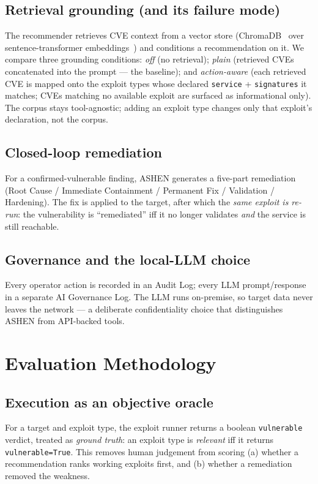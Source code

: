 \documentclass[conference]{IEEEtran}
\newcommand{\code}[1]{\texttt{#1}}
\begin{document}
\subsection{Retrieval grounding (and its failure mode)}
The recommender retrieves CVE context from a vector store (ChromaDB~\cite{chroma}
over sentence-transformer embeddings~\cite{sbert}) and conditions a recommendation
on it. We
compare three grounding conditions: \emph{off} (no retrieval); \emph{plain}
(retrieved CVEs concatenated into the prompt --- the baseline); and
\emph{action-aware} (each retrieved CVE is mapped onto the exploit types whose
declared \code{service} + \code{signatures} it matches; CVEs matching no available
exploit are surfaced as informational only). The corpus stays tool-agnostic;
adding an exploit type changes only that exploit's declaration, not the corpus.

\subsection{Closed-loop remediation}
For a confirmed-vulnerable finding, ASHEN generates a five-part remediation (Root
Cause / Immediate Containment / Permanent Fix / Validation / Hardening). The fix
is applied to the target, after which the \emph{same exploit is re-run}: the
vulnerability is ``remediated'' iff it no longer validates \emph{and} the service
is still reachable.

\subsection{Governance and the local-LLM choice}
Every operator action is recorded in an Audit Log; every LLM prompt/response in a
separate AI Governance Log. The LLM runs on-premise, so target data never leaves
the network --- a deliberate confidentiality choice that distinguishes ASHEN from
API-backed tools.

\section{Evaluation Methodology}\label{sec:method}
\subsection{Execution as an objective oracle}
For a target and exploit type, the exploit runner returns a boolean
\code{vulnerable} verdict, treated as \emph{ground truth}: an exploit type is
\emph{relevant} iff it returns \code{vulnerable=True}. This removes human
judgement from scoring (a) whether a recommendation ranks working exploits first,
and (b) whether a remediation removed the weakness.
\end{document}
